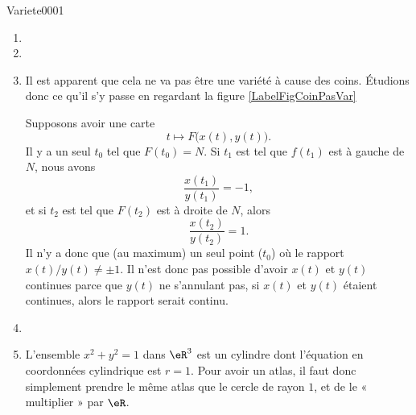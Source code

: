 \begin{corrige}{Variete0001}
\begin{enumerate}
		\item
		\item
		\item
			Il est apparent que cela ne va pas être une variété à cause des coins. Étudions donc ce qu'il s'y passe en regardant la figure \ref{LabelFigCoinPasVar}
			\newcommand{\CaptionFigCoinPasVar}{Ceci n'est pas une variété. Même pas le dessin d'une variété.}
			
			Supposons avoir une carte
			\begin{equation}
				t\mapsto F\big( x(t),y(t) \big).
			\end{equation}
			Il y a un seul $t_0$ tel que $F(t_0)=N$. Si $t_1$ est tel que $f(t_1)$ est à gauche de $N$, nous avons
			\begin{equation}
				\frac{ x(t_1) }{ y(t_1) }=-1,
			\end{equation}
			et si $t_2$ est tel que $F(t_2)$ est à droite de $N$, alors
			\begin{equation}
				\frac{ x(t_2) }{ y(t_2) }=1.
			\end{equation}
			Il n'y a donc que (au maximum) un seul point ($t_0$) où le rapport $x(t)/y(t)\neq\pm 1$. Il n'est donc pas possible d'avoir $x(t)$ et $y(t)$ continues parce que $y(t)$ ne s'annulant pas, si $x(t)$ et $y(t)$ étaient continues, alors le rapport serait continu.

		\item
		\item
			L'ensemble $x^2+y^2=1$ dans $\eR^3$ est un cylindre dont l'équation en coordonnées cylindrique est $r=1$. Pour avoir un atlas, il faut donc simplement prendre le même atlas que le cercle de rayon $1$, et de le « multiplier » par $\eR$.


\end{enumerate}
\end{corrige}
